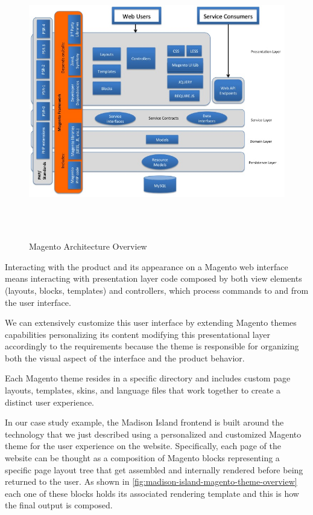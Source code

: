 \vspace{0.5cm}
\begin{figure}[H]
  \centering
    \includegraphics[height=12cm]{images/magento-architecture.jpg}
  \caption{Magento Architecture Overview}
  \label{fig:magento-architecture-overview}
\end{figure}
\vspace{0.5cm}


Interacting with the product and its appearance on a Magento web interface means interacting with presentation layer code composed by both view elements (layouts, blocks, templates) and controllers, which process commands to and from the user interface. 

We can extensively customize this user interface by extending Magento themes capabilities personalizing its content modifying this presentational layer accordingly to the requirements because the theme is responsible for organizing both the visual aspect of the interface and the product behavior.

Each Magento theme resides in a specific directory and includes custom page layouts, templates, skins, and language files that work together to create a distinct user experience.

In our case study example, the Madison Island frontend is built around the technology that we just described using a personalized and customized Magento theme for the user experience on the website. Specifically, each page of the website can be thought as a composition of Magento blocks representing a specific page layout tree that get assembled and internally rendered before being returned to the user. As shown in \ref{fig:madison-island-magento-theme-overview} each one of these blocks holds its associated rendering template and this is how the final output is composed.

